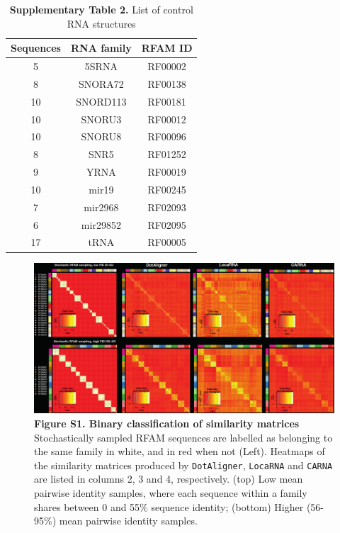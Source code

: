 \documentclass{bmcart}
\newcommand\dotaligner{\texttt{DotAligner}}
\newcommand\locarna{\texttt{LocaRNA}}
\newcommand\carna{\texttt{CARNA}}
\begin{document}
\begin{table}
\centering
\caption*{\textbf{Supplementary Table 2.}  List of control RNA structures }
\begin{tabular}{ccc}
\hline
Sequences & RNA family & RFAM ID \\
\hline
   5 & 5SRNA & RF00002 \\
   8 & SNORA72 & RF00138 \\
  10 & SNORD113 & RF00181\\
  10 & SNORU3 & RF00012\\
  10 & SNORU8 & RF00096\\
   8 & SNR5 & RF01252\\
   9 & YRNA & RF00019\\
  10 & mir19 & RF00245\\
   7 & mir2968 & RF02093\\
   6 & mir29852 & RF02095\\
  17 & tRNA & RF00005\\
\hline
\end{tabular}
\end{table}


\begin{figure}
 \includegraphics[width=\textwidth]{SF1}
 \caption*{ \textbf{ Figure S1. Binary classification of similarity matrices  }\\
Stochastically sampled RFAM sequences are labelled as belonging to the same family in white, and in red when not (Left). Heatmaps of the similarity matrices produced by \dotaligner{}, \locarna{} and \carna{} are listed in columns 2, 3 and 4, respectively.  
(top) Low mean pairwise identity samples, where each sequence within 
a family shares between 0 and 55\% sequence identity; (bottom) Higher (56-95\%) mean pairwise identity samples. }
\end{figure}
\end{document}
